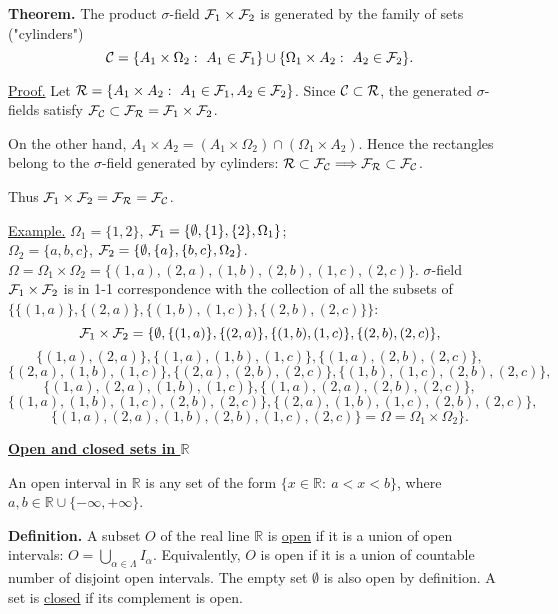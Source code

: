 \documentclass[a4paper,10pt]{article}
\def\RR{\mathbb{R}}
\newcommand{\1}[1]{\mathbf{1}_{\{#1\}}}
\begin{document}
{\bf Theorem.} The product $\sigma$-field ${\cal F}_1\times{\cal F}_2$ is generated by the family of sets ("cylinders")
  $${\cal C}=\{A_1\times\Omega_2:~A_1\in{\cal F}_1\}\cup\{\Omega_1\times A_2:~A_2\in{\cal F}_2\}.$$

\underline{Proof.} Let ${\cal R}=\{A_1\times A_2:~A_1\in{\cal F}_1,A_2\in{\cal F}_2\}$. Since ${\cal C}\subset{\cal R}$, the generated $\sigma$-fields satisfy ${\cal F_C}\subset {\cal F_R}={\cal F}_1\times{\cal F}_2$.

On the other hand, $A_1\times A_2=(A_1\times\Omega_2)\cap (\Omega_1\times A_2)$. Hence the rectangles belong to the $\sigma$-field generated by cylinders: ${\cal R}\subset{\cal F_C}\Longrightarrow {\cal F_R}\subset {\cal F_C}$.

Thus ${\cal F}_1\times{\cal F}_2 ={\cal F_R}={\cal F_C}$. \blacksquare\vspace{3mm}

\underline{Example.} $\Omega_1=\{1,2\}$, ${\cal F}_1=\{\emptyset, \{1\},\{2\},\Omega_1\}$;\\
$\Omega_2=\{a,b,c\}$, ${\cal F}_2=\{\emptyset, \{a\},\{b,c\},\Omega_2\}$.\\
$\Omega=\Omega_1\times\Omega_2=\{(1,a),(2,a),(1,b),(2,b),(1,c),(2,c)\}$. $\sigma$-field ${\cal F}_1\times{\cal F}_2$ is in 1-1 correspondence with the collection of all the subsets of \linebreak $\{\{(1,a)\},\{(2,a)\},\{(1,b),(1,c)\},\{(2,b),(2,c)\}\}$:
  $${\cal F}_1\times{\cal F}_2=\{\emptyset, \{(1,a)\},\{(2,a)\},\{(1,b),(1,c)\},\{(2,b),(2,c)\},$$
  $$\{(1,a),(2,a)\},\{(1,a),(1,b),(1,c)\},\{(1,a),(2,b),(2,c)\},$$
  $$\{(2,a),(1,b),(1,c)\},\{(2,a),(2,b),(2,c)\},\{(1,b),(1,c),(2,b),(2,c)\},$$
  $$\{(1,a),(2,a),(1,b),(1,c)\},\{(1,a),(2,a),(2,b),(2,c)\},$$
  $$\{(1,a),(1,b),(1,c),(2,b),(2,c)\},\{(2,a),(1,b),(1,c),(2,b),(2,c)\},$$
  $$\{(1,a),(2,a),(1,b),(2,b),(1,c),(2,c)\}=\Omega=\Omega_1\times\Omega_2\}.$$\vspace{3mm}

\begin{center}\bf\underline{Open and closed sets in $\RR$} \end{center}

An open interval  in $\RR$ is any set of the form $\{x\in\RR:~a<x<b\}$, where $a,b\in\RR\cup\{-\infty,+\infty\}$. \vspace{3mm}

{\bf Definition.} A subset $O$ of the real line $\RR$ is \underline{open} if it is a union of open intervals: $O=\bigcup_{\alpha\in\Lambda} I_\alpha$. Equivalently, $O$ is open if it is a union of countable number of disjoint open intervals.
The empty set $\emptyset$ is also open by definition.  A set is \underline{closed} if its complement is open. \vspace{3mm}
\end{document}
